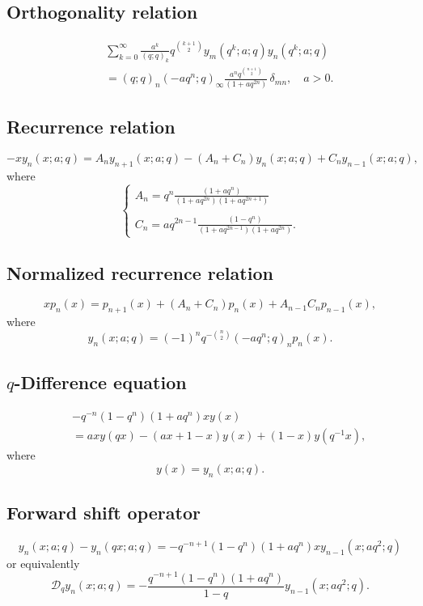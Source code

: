 \documentclass[envcountchap,graybox]{svmono}
\begin{document}
\newpage

\subsection*{Orthogonality relation}
\begin{eqnarray}
\label{OrtqBessel}
& &\sum_{k=0}^{\infty}\frac{a^k}{(q;q)_k}q^{\binom{k+1}{2}}y_m(q^k;a;q)y_n(q^k;a;q)\nonumber\\
& &{}=(q;q)_n(-aq^n;q)_{\infty}\frac{a^nq^{\binom{n+1}{2}}}{(1+aq^{2n})}\,\delta_{mn},\quad a>0.
\end{eqnarray}

\subsection*{Recurrence relation}
\begin{equation}
\label{RecqBessel}
-xy_n(x;a;q)=A_ny_{n+1}(x;a;q)-(A_n+C_n)y_n(x;a;q)+C_ny_{n-1}(x;a;q),
\end{equation}
where
$$\left\{\begin{array}{l}\displaystyle A_n=q^n\frac{(1+aq^n)}{(1+aq^{2n})(1+aq^{2n+1})}\\
\\
\displaystyle C_n=aq^{2n-1}\frac{(1-q^n)}{(1+aq^{2n-1})(1+aq^{2n})}.\end{array}\right.$$

\subsection*{Normalized recurrence relation}
\begin{equation}
\label{NormRecqBessel}
xp_n(x)=p_{n+1}(x)+(A_n+C_n)p_n(x)+A_{n-1}C_np_{n-1}(x),
\end{equation}
where
$$y_n(x;a;q)=(-1)^nq^{-\binom{n}{2}}(-aq^n;q)_np_n(x).$$

\subsection*{$q$-Difference equation}
\begin{eqnarray}
\label{dvqBessel}
& &-q^{-n}(1-q^n)(1+aq^n)xy(x)\nonumber\\
& &{}=axy(qx)-(ax+1-x)y(x)+(1-x)y(q^{-1}x),
\end{eqnarray}
where
$$y(x)=y_n(x;a;q).$$

\newpage

\subsection*{Forward shift operator}
\begin{equation}
\label{shift1qBesselI}
y_n(x;a;q)-y_n(qx;a;q)=-q^{-n+1}(1-q^n)(1+aq^n)xy_{n-1}(x;aq^2;q)
\end{equation}
or equivalently
\begin{equation}
\label{shift1qBesselII}
\mathcal{D}_qy_n(x;a;q)=-\frac{q^{-n+1}(1-q^n)(1+aq^n)}{1-q}y_{n-1}(x;aq^2;q).
\end{equation}
\end{document}
